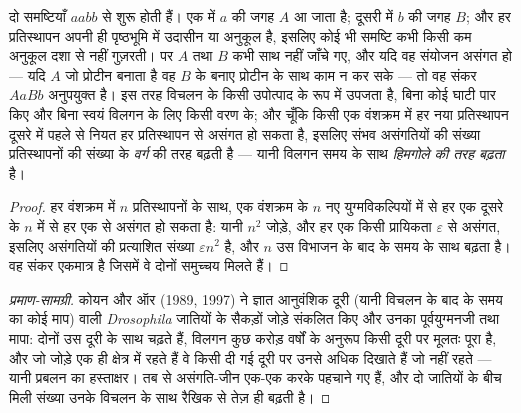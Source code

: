 \begin{theorem}[संकर क्यों चूकते हैं: दो-स्थल प्रतिरूप]\label{thm:b2:speciation:dm}
दो समष्टियाँ  $aabb$ से शुरू होती हैं। एक में $a$ की जगह
$A$ आ जाता है; दूसरी में $b$ की जगह $B$; और हर प्रतिस्थापन अपनी ही
पृष्ठभूमि में उदासीन या अनुकूल है, इसलिए कोई भी समष्टि कभी किसी कम अनुकूल दशा से
नहीं गुज़रती। पर $A$ तथा $B$ कभी साथ नहीं जाँचे गए, और
यदि वह संयोजन असंगत हो --- यदि $A$ जो प्रोटीन बनाता है वह $B$ के बनाए
प्रोटीन के साथ काम न कर सके --- तो वह संकर $AaBb$ अनुपयुक्त है। इस तरह
 विचलन के किसी उपोत्पाद के रूप में उपजता है, बिना कोई घाटी पार किए और बिना
स्वयं विलगन के लिए किसी वरण के; और चूँकि किसी एक वंशक्रम में हर नया प्रतिस्थापन
दूसरे में पहले से नियत हर प्रतिस्थापन से असंगत हो सकता है, इसलिए संभव
असंगतियों की संख्या प्रतिस्थापनों की संख्या के \emph{वर्ग} की तरह
बढ़ती है --- यानी विलगन समय के साथ \emph{हिमगोले की तरह बढ़ता} है।
\end{theorem}
\begin{proof}
हर वंशक्रम में $n$ प्रतिस्थापनों के साथ, एक वंशक्रम के $n$ नए युग्मविकल्पियों में से
हर एक दूसरे के $n$ में से हर एक से असंगत हो सकता है:
यानी $n^{2}$ जोड़े, और हर एक किसी प्रायिकता
$\varepsilon$ से असंगत, इसलिए असंगतियों की प्रत्याशित संख्या
$\varepsilon n^{2}$ है, और $n$ उस विभाजन के बाद के समय के साथ बढ़ता है।
वह संकर एकमात्र  है जिसमें वे दोनों समुच्चय मिलते हैं।
\end{proof}
\begin{proof}[प्रमाण-सामग्री]
कोयन और ऑर (1989, 1997) ने ज्ञात आनुवंशिक दूरी (यानी
विचलन के बाद के समय का कोई माप) वाली \emph{Drosophila} जातियों के सैकड़ों
जोड़े संकलित किए और उनका पूर्वयुग्मनजी तथा
 मापा: दोनों उस दूरी के साथ चढ़ते हैं, विलगन
कुछ करोड़ वर्षों के अनुरूप किसी दूरी पर
मूलतः पूरा है, और जो जोड़े एक ही क्षेत्र में रहते हैं वे किसी दी गई दूरी पर
उनसे अधिक  दिखाते हैं जो नहीं रहते ---
यानी प्रबलन का हस्ताक्षर। तब से असंगति-जीन एक-एक करके
पहचाने गए हैं, और दो जातियों के बीच मिली संख्या उनके विचलन के साथ
रैखिक से तेज़ ही बढ़ती है।
\end{proof}

